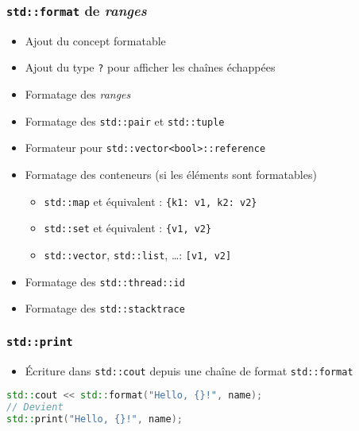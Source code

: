 \documentclass[C++.tex]{subfiles}
\begin{document}
\begin{frame}[fragile]
	\frametitle{\lstinline|std::format| de \textit{ranges}}
	\begin{itemize}
		\item Ajout du concept formatable
		\item Ajout du type \lstinline|?| pour afficher les chaînes échappées
		\item Formatage des \textit{ranges}
		\item Formatage des \lstinline|std::pair| et \lstinline|std::tuple|
		\item Formateur pour \lstinline|std::vector<bool>::reference|
		\item Formatage des conteneurs (si les éléments sont formatables)
		\begin{itemize}
			\item \lstinline|std::map| et équivalent : \lstinline|{k1: v1, k2: v2}|
			\item \lstinline|std::set| et équivalent : \lstinline|{v1, v2}|
			\item \lstinline|std::vector|, \lstinline|std::list|, \ldots : \lstinline|[v1, v2]|
		\end{itemize}
		\item Formatage des \lstinline|std::thread::id|
		\item Formatage des \lstinline|std::stacktrace|
	\end{itemize}
\end{frame}

\begin{frame}[fragile]
	\frametitle{\lstinline|std::print|}
	\begin{itemize}
		\item Écriture dans \lstinline|std::cout| depuis une chaîne de format \lstinline|std::format|
	\end{itemize}

	\begin{lstlisting}[language=C++]
std::cout << std::format("Hello, {}!", name);
// Devient
std::print("Hello, {}!", name);\end{lstlisting}
\end{frame}
\end{document}
